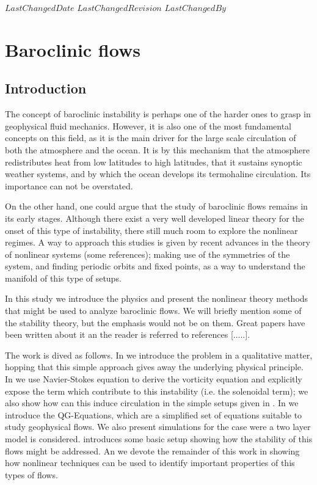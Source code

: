 {$LastChangedDate$}
{$LastChangedRevision$} {$LastChangedBy$}

\chapter{Baroclinic flows}
\label{chap:baroclinic}

\section{Introduction}
\label{s:intro}
The concept of baroclinic instability is perhaps one of the harder ones
to grasp in geophysical fluid mechanics. However, it is also one of the
most fundamental concepts on this field, as it is the main driver for the
large scale circulation of both the atmosphere and the ocean. It is by this
mechanism that the atmosphere redistributes heat from low latitudes to
high latitudes, that it sustains synoptic weather systems, and by which
the ocean develops its termohaline circulation. Its importance can not be
overstated.

On the other hand, one could argue that the study of baroclinic flows
remains in its early stages. Although there exist a very well developed
linear theory for the onset of this type of instability, there still much
room to explore the nonlinear regimes. A way to approach this studies is
given by recent advances in the theory of nonlinear systems (some
references); making use of the symmetries of the system, and finding
periodic orbits and fixed points, as a way to understand the manifold of
this type of setups.

In this study we introduce the physics and present the nonlinear theory
methods that might be used to analyze baroclinic flows. We will briefly
mention some of the stability theory, but the emphasis would not be on
them. Great papers have been written about it an the reader is referred
to references [.....].

The work is dived as follows. In  we introduce the
problem in a qualitative matter, hopping that this simple approach gives
away the underlying physical principle. In  we
use Navier-Stokes equation to derive the vorticity equation and
explicitly expose the term which contribute to this instability (i.e. the
solenoidal term); we also show how can this induce circulation in the
simple setups given in . In  we
introduce the QG-Equations, which are a simplified set of equations
suitable to study geophysical flows. We also present simulations for the
case were a two layer model is considered.  
introduces some basic setup showing how the stability of this flows might
be addressed. An we devote the remainder of this work in showing how
nonlinear techniques can be used to identify important properties of this
types of flows.

